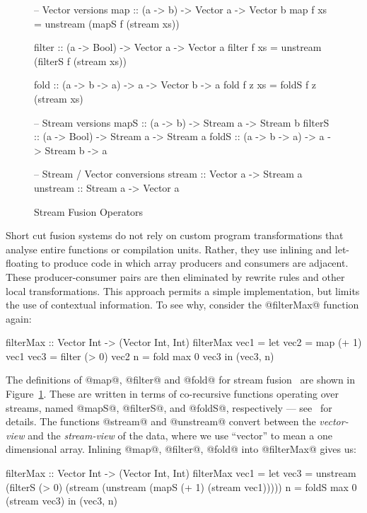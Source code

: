 \begin{figure}
\begin{code}
 -- Vector versions
 map    :: (a -> b) -> Vector a -> Vector b
 map f xs    = unstream (mapS f (stream xs))

 filter :: (a -> Bool) -> Vector a -> Vector a
 filter f xs = unstream (filterS f (stream xs))

 fold   :: (a -> b -> a) -> a -> Vector b -> a
 fold f z xs = foldS f z (stream xs)

 -- Stream versions
 mapS     :: (a -> b)    -> Stream a -> Stream b
 filterS  :: (a -> Bool) -> Stream a -> Stream a
 foldS    :: (a -> b -> a) -> a -> Stream b -> a

 -- Stream / Vector conversions
 stream   :: Vector a -> Stream a
 unstream :: Stream a -> Vector a
\end{code}

\caption{Stream Fusion Operators}
\label{f:stream-fusion-operators}
\end{figure}
%
Short cut fusion systems do not rely on custom program transformations that analyse entire functions or compilation units. Rather, they use inlining and let-floating to produce code in which array producers and consumers are adjacent. These producer-consumer pairs are then eliminated by rewrite rules and other local transformations. This approach permits a simple implementation, but limits the use of contextual information. To see why, consider the @filterMax@ function again:
%
\begin{code}
  filterMax :: Vector Int -> (Vector Int, Int)
  filterMax vec1
   = let vec2    = map    (+ 1) vec1
         vec3    = filter (> 0) vec2
         n       = fold max 0 vec3
     in  (vec3, n)
\end{code}
%
The definitions of @map@, @filter@ and @fold@ for stream fusion~\cite{Coutts:stream-fusion} are shown in Figure~\ref{f:stream-fusion-operators}. These are written in terms of co-recursive functions operating over streams, named @mapS@, @filterS@, and @foldS@, respectively --- see~\cite{Coutts:stream-fusion} for details. The functions @stream@ and @unstream@ convert between the \emph{vector-view} and the \emph{stream-view} of the data, where we use ``vector'' to mean a one dimensional array.  Inlining @map@, @filter@, @fold@ into @filterMax@ gives us:
%
\begin{code}
filterMax :: Vector Int -> (Vector Int, Int)
filterMax vec1
 = let vec3 = unstream 
                  (filterS (> 0) (stream (unstream 
                     (mapS (+ 1) (stream vec1)))))
       n    = foldS max 0 (stream vec3)
   in  (vec3, n)
\end{code}
